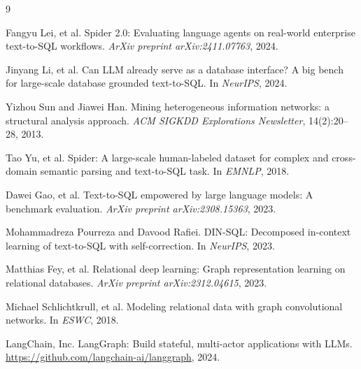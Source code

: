 \documentclass[11pt]{article}
\begin{document}
\begin{thebibliography}{9}

Fangyu Lei, et al.
\newblock Spider 2.0: Evaluating language agents on real-world enterprise text-to-SQL workflows.
\newblock \emph{ArXiv preprint arXiv:2411.07763}, 2024.

Jinyang Li, et al.
\newblock Can LLM already serve as a database interface? A big bench for large-scale database grounded text-to-SQL.
\newblock In \emph{NeurIPS}, 2024.

Yizhou Sun and Jiawei Han.
\newblock Mining heterogeneous information networks: a structural analysis approach.
\newblock \emph{ACM SIGKDD Explorations Newsletter}, 14(2):20--28, 2013.

Tao Yu, et al.
\newblock Spider: A large-scale human-labeled dataset for complex and cross-domain semantic parsing and text-to-SQL task.
\newblock In \emph{EMNLP}, 2018.

Dawei Gao, et al.
\newblock Text-to-SQL empowered by large language models: A benchmark evaluation.
\newblock \emph{ArXiv preprint arXiv:2308.15363}, 2023.

Mohammadreza Pourreza and Davood Rafiei.
\newblock DIN-SQL: Decomposed in-context learning of text-to-SQL with self-correction.
\newblock In \emph{NeurIPS}, 2023.

Matthias Fey, et al.
\newblock Relational deep learning: Graph representation learning on relational databases.
\newblock \emph{ArXiv preprint arXiv:2312.04615}, 2023.

Michael Schlichtkrull, et al.
\newblock Modeling relational data with graph convolutional networks.
\newblock In \emph{ESWC}, 2018.

LangChain, Inc.
\newblock LangGraph: Build stateful, multi-actor applications with LLMs.
\newblock \url{https://github.com/langchain-ai/langgraph}, 2024.

\end{thebibliography}
\end{document}

